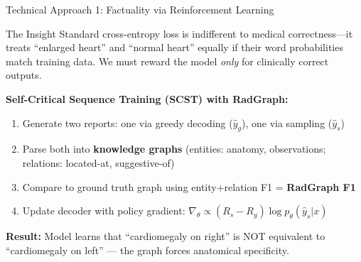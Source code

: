 \documentclass[aspectratio=169]{beamer}
\begin{document}
\begin{frame}{Technical Approach 1: Factuality via Reinforcement Learning}
  
  \begin{block}{The Insight}
    Standard cross-entropy loss is indifferent to medical correctness—it treats ``enlarged heart'' and ``normal heart'' equally if their word probabilities match training data. We must reward the model \emph{only} for clinically correct outputs.
  \end{block}
  
  \vspace{0.3cm}
  
  \textbf{Self-Critical Sequence Training (SCST) with RadGraph:}
  
  \begin{enumerate}
    \item Generate two reports: one via greedy decoding ($\hat{y}_g$), one via sampling ($\hat{y}_s$)
    \item Parse both into \textbf{knowledge graphs} (entities: anatomy, observations; relations: located-at, suggestive-of)
    \item Compare to ground truth graph using entity+relation F1 = \textbf{RadGraph F1}
    \item Update decoder with policy gradient: $\nabla_\theta \propto (R_s - R_g) \log p_\theta(\hat{y}_s | x)$
  \end{enumerate}
  
  \vspace{0.3cm}
  
  \textbf{Result:} Model learns that ``cardiomegaly on right'' is NOT equivalent to ``cardiomegaly on left'' — the graph forces anatomical specificity.
  
\end{frame}
\end{document}
